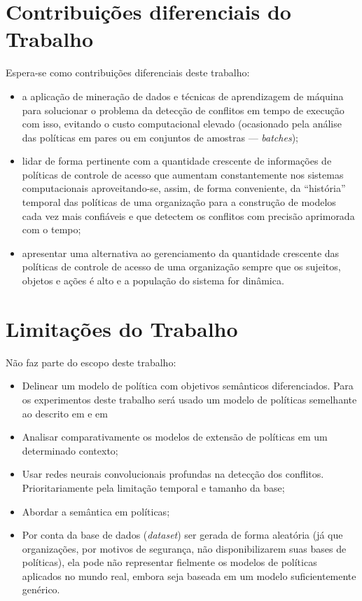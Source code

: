 \documentclass[
	12pt,				%
	openright,			%
	oneside,			%
	a4paper,			%
	english,			%
	french,				%
	spanish,			%
	brazil				%
	]{abntex2}
\begin{document}
\section{Contribuições diferenciais do Trabalho}\label{contribuicoes}
Espera-se como contribuições diferenciais deste trabalho:
\begin{itemize}
	\item a aplicação de mineração de dados e técnicas de aprendizagem de máquina para solucionar o problema da detecção de conflitos em tempo de execução com isso, evitando o custo computacional elevado (ocasionado pela análise das políticas em pares ou em conjuntos de amostras --- \textit{batches});
	\item lidar de forma pertinente com a quantidade crescente de informações de políticas de controle de acesso que aumentam constantemente nos sistemas computacionais aproveitando-se, assim, de forma conveniente, da ``história'' temporal das políticas de uma organização para a construção de modelos cada vez mais confiáveis e que detectem os conflitos com precisão aprimorada com o tempo;
	\item apresentar uma alternativa ao gerenciamento da quantidade crescente das políticas de controle de acesso de uma organização sempre que os sujeitos, objetos e ações é alto e a população do sistema for dinâmica.
	
\end{itemize} 

\section{Limitações do Trabalho}\label{limitacoes}
Não faz parte do escopo deste trabalho:
\begin{itemize}
	\item Delinear um modelo de política com objetivos semânticos diferenciados. Para os experimentos deste trabalho será usado um modelo de políticas semelhante ao descrito em  e em 
	\item Analisar comparativamente os modelos de extensão de políticas em um determinado contexto;
	\item Usar redes neurais convolucionais profundas na detecção dos conflitos. Prioritariamente pela limitação temporal e tamanho da base;
	\item Abordar a semântica em políticas;
	\item Por conta da base de dados (\textit{dataset}) ser gerada de forma aleatória (já que organizações, por motivos de segurança, não disponibilizarem suas bases de políticas), ela pode não representar fielmente os modelos de políticas aplicados no mundo real, embora seja baseada em um modelo suficientemente genérico.%
\end{itemize} 
\end{document}
